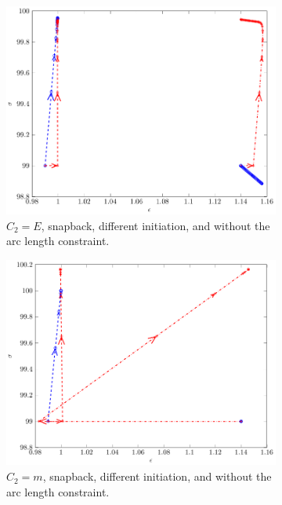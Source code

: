 \documentclass[10pt]{elsarticle}
\begin{document}
\begin{figure}
\begin{subfigure}{0.45\textwidth}
		\centering
		\includegraphics[scale=0.7]{./conv_figs/bad_metric_snap_no_arclength_add.pdf}
		\caption{$C_2=E$, snapback, different initiation, and without the arc length constraint.}
		\label{bad_metric_snap_no_arclength_add}
	\end{subfigure}
	\hfill
	\begin{subfigure}{0.45\textwidth}
		\centering
		\includegraphics[scale=0.7]{./conv_figs/good_metric_snap_no_arclength_add.pdf}
		\caption{$C_2=m$, snapback, different initiation, and without the arc length constraint.}
		\label{good_metric_snap_no_arclength_add}
	\end{subfigure}
\centering
	\begin{subfigure}{0.45\textwidth}

\end{subfigure}
\end{figure}
\end{document}
